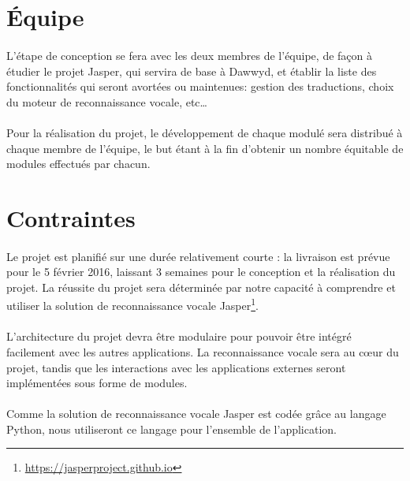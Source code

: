 \documentclass[12pt]{article}
\begin{document}
    \section{Équipe}

\paragraph{}
L'étape de conception se fera avec les deux membres de l'équipe, de façon à
étudier le projet Jasper, qui servira de base à Dawwyd, et établir la liste des
fonctionnalités qui seront avortées ou maintenues: gestion des traductions,
choix du moteur de reconnaissance vocale, etc\dots

\paragraph{}
Pour la réalisation du projet, le développement de chaque modulé sera
distribué à chaque membre de l'équipe, le but étant à la fin d'obtenir un
nombre équitable de modules effectués par chacun.

    \section{Contraintes}

\paragraph{}
Le projet est planifié sur une durée relativement courte : la livraison
est prévue pour le 5 février 2016, laissant 3 semaines pour le conception et la
réalisation du projet. La réussite du projet sera déterminée par notre capacité
à comprendre et utiliser la solution de reconnaissance vocale
Jasper\footnote{\url{https://jasperproject.github.io}}.

\paragraph{}
L'architecture du projet devra être modulaire pour pouvoir être intégré
facilement avec les autres applications. La reconnaissance vocale sera au
cœur du projet, tandis que les interactions avec les applications externes
seront implémentées sous forme de modules.

\paragraph{}
Comme la solution de reconnaissance vocale Jasper est codée grâce au langage
Python, nous utiliseront ce langage pour l'ensemble de l'application.
\end{document}

